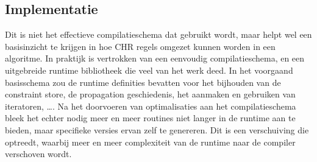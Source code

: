 \subsection{Implementatie}

Dit is niet het effectieve compilatieschema dat gebruikt wordt, maar helpt wel een basisinzicht te krijgen in hoe CHR regels omgezet kunnen worden in een algoritme. In praktijk is vertrokken van een eenvoudig compilatieschema, en een uitgebreide runtime bibliotheek die veel van het werk deed. In het voorgaand basisschema zou de runtime definities bevatten voor het bijhouden van de constraint store, de propagation geschiedenis, het aanmaken en gebruiken van iteratoren, \ldots. Na het doorvoeren van optimalisaties aan het compilatieschema bleek het echter nodig meer en meer routines niet langer in de runtime aan te bieden, maar specifieke versies ervan zelf te genereren. Dit is een verschuiving die optreedt, waarbij meer en meer complexiteit van de runtime naar de compiler verschoven wordt.
